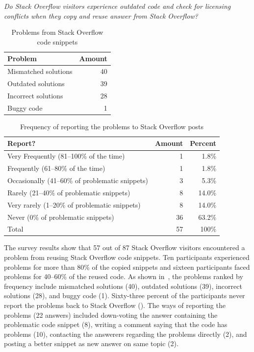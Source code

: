 \documentclass[10pt,journal,compsoc]{IEEEtran}
\begin{document}
\vspace{0.25cm}
\textit{Do Stack Overflow
	visitors experience outdated code and check for licensing conflicts when
	they copy and reuse answer from Stack Overflow?}
\vspace{0.25cm}

\begin{table}
	\centering
	\caption{Problems from Stack Overflow code snippets}
	\label{tab:visitor_survey_code_problems}
	\begin{tabular}{lr}
		\toprule
		Problem & Amount \\
		\midrule
		Mismatched solutions & 40 \\
		Outdated solutions & 39 \\
		Incorrect solutions	& 28 \\
		Buggy code & 1 \\
		\bottomrule
	\end{tabular}
\end{table}

\begin{table}
	\centering
	\caption{Frequency of reporting the problems to Stack Overflow posts}
	\label{tab:visitor_survey_report_problem}
	\begin{tabular}{lrr}
		\toprule
		Report? & Amount & Percent \\
		\midrule
		Very Frequently (81--100\% of the time)	& 1 & 1.8\% \\
		Frequently (61--80\% of the time) & 1 & 1.8\% \\
		Occasionally (41--60\% of problematic snippets) & 3 & 5.3\% \\
		Rarely (21--40\% of problematic snippets) & 8 & 14.0\% \\
		Very rarely (1--20\% of problematic snippets) & 8 & 14.0\% \\
		Never (0\% of problematic snippets) & 36 & 63.2\% \\
		\midrule
		Total & 57 & 100\% \\
		\bottomrule
	\end{tabular}
\end{table}

The survey results show that 57 out of 87 Stack Overflow visitors encountered a
problem from reusing Stack Overflow code snippets. Ten participants experienced
problems for more than 80\% of the copied snippets and sixteen participants
faced problems for 40--60\% of the reused code. As shown in~, 
the problems ranked by frequency
include mismatched solutions (40), outdated solutions (39), incorrect solutions
(28), and buggy code (1). Sixty-three percent of the participants never report
the problems back to Stack Overflow (). 
The ways of reporting the problems
(22 answers) included down-voting the answer containing the problematic code
snippet (8), writing a comment saying that the code has problems (10),
contacting the answerers regarding the problems directly (2), and posting a
better snippet as new answer on same topic (2).
\end{document}
